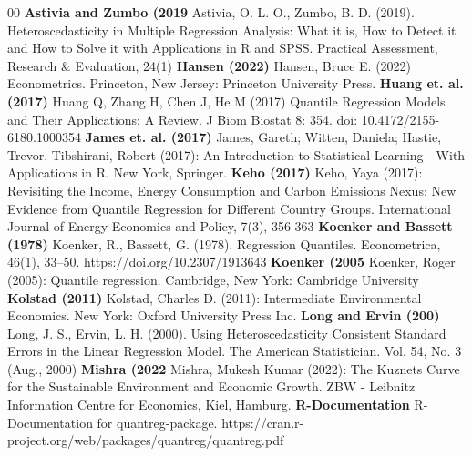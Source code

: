 \documentclass[conference]{IEEEtran}
\begin{document}
\begin{thebibliography}{00}
 \textbf{Astivia and Zumbo (2019} Astivia, O. L. O., Zumbo, B. D. (2019). Heteroscedasticity in Multiple Regression Analysis: What it is, How to Detect it and How to Solve it with Applications in R and SPSS. Practical Assessment, Research \& Evaluation, 24(1)
 \textbf{Hansen (2022)} Hansen, Bruce E. (2022) Econometrics. Princeton, New Jersey: Princeton University Press.
 \textbf{Huang et. al. (2017)}  Huang Q, Zhang H, Chen J, He M (2017) Quantile Regression Models and Their Applications: A Review. J Biom Biostat 8: 354. doi: 10.4172/2155- 6180.1000354
 \textbf{James et. al. (2017)} James, Gareth; Witten, Daniela; Hastie, Trevor, Tibshirani, Robert (2017): An Introduction to Statistical Learning - With Applications in R. New York, Springer.
 \textbf{Keho (2017)} Keho, Yaya (2017): Revisiting the Income, Energy Consumption and Carbon Emissions Nexus: New Evidence from Quantile Regression for Different Country Groups. International Journal of Energy Economics and Policy, 7(3), 356-363
 \textbf{Koenker and Bassett (1978)} Koenker, R.,  Bassett, G. (1978). Regression Quantiles. Econometrica, 46(1), 33–50. https://doi.org/10.2307/1913643
 \textbf{Koenker (2005} Koenker, Roger (2005): Quantile regression. Cambridge, New York: Cambridge University
 \textbf{Kolstad (2011)} Kolstad, Charles D. (2011): Intermediate Environmental Economics. New York: Oxford University Press Inc.
 \textbf{Long and Ervin (200)} Long, J. S., Ervin, L. H. (2000). Using Heteroscedasticity Consistent Standard Errors in the Linear Regression Model. The American Statistician. Vol. 54, No. 3 (Aug., 2000)
 \textbf{Mishra (2022} Mishra, Mukesh Kumar (2022): The Kuznets Curve for the Sustainable Environment and Economic Growth. ZBW - Leibnitz Information Centre for Economics, Kiel, Hamburg.
 \textbf{R-Documentation} R-Documentation for quantreg-package. https://cran.r-project.org/web/packages/quantreg/quantreg.pdf
\end{thebibliography}
\end{document}
